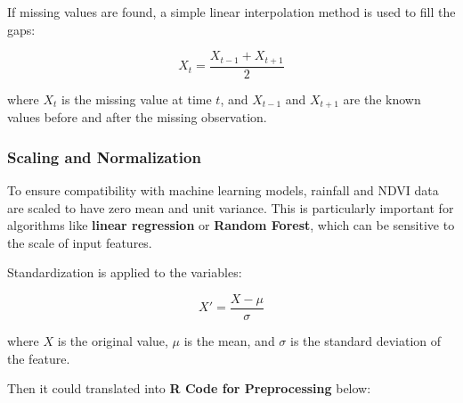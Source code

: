 \documentclass[
]{article}
\begin{document}
If missing values are found, a simple linear interpolation method is
used to fill the gaps:

\[
X_t = \frac{X_{t-1} + X_{t+1}}{2}
\]

where \(X_t\) is the missing value at time \(t\), and \(X_{t-1}\) and
\(X_{t+1}\) are the known values before and after the missing
observation.

\subsubsection{Scaling and
Normalization}\label{scaling-and-normalization}

To ensure compatibility with machine learning models, rainfall and NDVI
data are scaled to have zero mean and unit variance. This is
particularly important for algorithms like \textbf{linear regression} or
\textbf{Random Forest}, which can be sensitive to the scale of input
features.

Standardization is applied to the variables:

\[
X' = \frac{X - \mu}{\sigma}
\]

where \(X\) is the original value, \(\mu\) is the mean, and \(\sigma\)
is the standard deviation of the feature.

Then it could translated into \textbf{R Code for Preprocessing} below:
\end{document}
